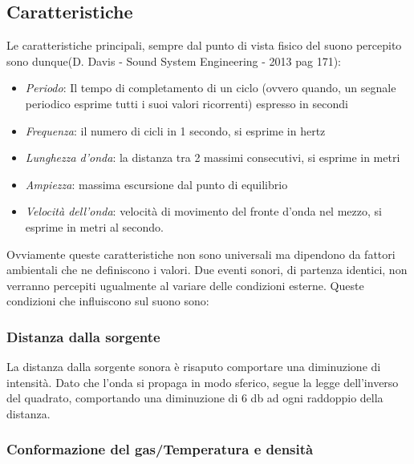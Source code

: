 \subsection{Caratteristiche}
Le caratteristiche principali, sempre dal punto di vista fisico del suono percepito sono dunque(D. Davis - Sound System Engineering - 2013 pag 171):
\begin{itemize}
      \item \emph{Periodo}: 
      Il tempo di completamento di un ciclo (ovvero quando, un segnale periodico esprime tutti i suoi valori ricorrenti) espresso in secondi
      \item \emph{Frequenza}:
      il numero di cicli in 1 secondo, si esprime in hertz
      \item \emph{Lunghezza d'onda}:
      la distanza tra 2 massimi consecutivi, si esprime in metri
      \item \emph{Ampiezza}: 
      massima escursione dal punto di equilibrio
      \item \emph{Velocità dell'onda}: 
      velocità di movimento del fronte d'onda nel mezzo, si esprime in metri al secondo.
\end{itemize}

Ovviamente queste caratteristiche non sono universali ma dipendono da fattori ambientali che ne definiscono i valori. Due eventi sonori, di partenza identici, non verranno percepiti ugualmente al variare delle condizioni esterne.
Queste condizioni che influiscono sul suono sono:

\subsubsection{Distanza dalla sorgente}

La distanza dalla sorgente sonora è risaputo comportare una diminuzione di intensità. Dato che l’onda si propaga in modo sferico, segue la legge dell’inverso del quadrato, comportando una diminuzione di 6 db ad ogni raddoppio della distanza.

\subsubsection{Conformazione del gas/Temperatura e densità}

